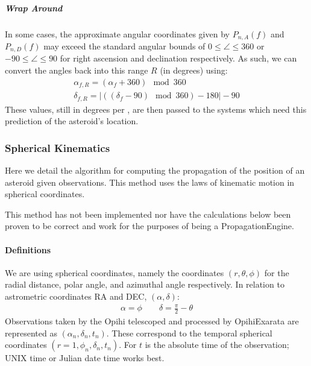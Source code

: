 \documentclass[letterpaper,11pt,english]{sphinxmanual}
\begin{document}
\subparagraph{Wrap Around}
\label{\detokenize{technical/algorithms/polynomial_propagation:wrap-around}}
\sphinxAtStartPar
In some cases, the approximate angular coordinates given by \(P_{n,A}(f)\)
and \(P_{n,D}(f)\) may exceed the standard angular bounds of
\(0 \leq \angle \leq 360\) or \(-90 \leq \angle \leq 90\) for right
ascension and declination respectively. As such, we can convert the angles
back into this range \(R\) (in degrees) using:
\begin{equation*}
\begin{split}\alpha_{f,R} = (\alpha_f + 360) \mod 360 \\
\delta_{f,R} = \left| ((\delta_f - 90) \mod 360) - 180 \right| - 90\end{split}
\end{equation*}
\sphinxAtStartPar
These values, still in degrees per {\hyperref[\detokenize{technical/conventions:technical-conventions}]{}}, are then
passed to the systems which need this prediction of the asteroid’s location.

\sphinxstepscope


\subsubsection{Spherical Kinematics}
\label{\detokenize{technical/algorithms/spherical_kinematics:spherical-kinematics}}\label{\detokenize{technical/algorithms/spherical_kinematics::doc}}
\sphinxAtStartPar
Here we detail the algorithm for computing the propagation of the position of
an asteroid given observations. This method uses the laws of kinematic motion
in spherical coordinates.

\sphinxAtStartPar
{}This method has not been implemented nor have the calculations below been
proven to be correct and work for the purposes of being a PropagationEngine.


\paragraph{Definitions}
\label{\detokenize{technical/algorithms/spherical_kinematics:definitions}}
\sphinxAtStartPar
We are using spherical coordinates, namely the coordinates
\((r, \theta, \phi)\) for the radial distance, polar angle, and azimuthal
angle respectively. In relation to astrometric coordinates RA and DEC,
\((\alpha, \delta)\):
\begin{equation*}
\begin{split}\alpha = \phi   \qquad   \delta = \frac{\pi}{2} - \theta\end{split}
\end{equation*}
\sphinxAtStartPar
Observations taken by the Opihi telescoped and processed by OpihiExarata are
represented as \((\alpha_n, \delta_n, t_n)\). These correspond to the
temporal spherical coordinates \((r=1, \phi_n, \delta_n, t_n)\). For
\(t\) is the absolute time of the observation; UNIX time or Julian date
time works best.
\end{document}
